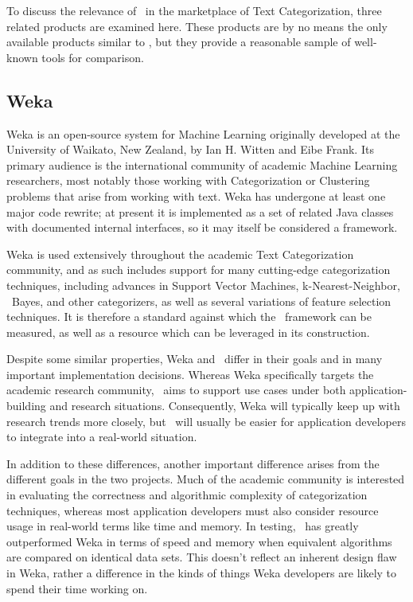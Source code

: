 To discuss the relevance of \aicat\ in the marketplace of Text
Categorization, three related products are examined here.  These
products are by no means the only available products similar to
\aicat, but they provide a reasonable sample of well-known tools for
comparison.

\subsection{Weka}

Weka is an open-source system for Machine Learning originally
developed at the University of Waikato, New Zealand, by Ian H. Witten
and Eibe Frank.\cite{weka} Its primary
audience is the international community of academic Machine Learning
researchers, most notably those working with Categorization or
Clustering problems that arise from working with text.  Weka has
undergone at least one major code rewrite; at present it is
implemented as a set of related Java classes with documented internal
interfaces, so it may itself be considered a framework.

Weka is used extensively throughout the academic Text Categorization
community, and as such includes support for many cutting-edge
categorization techniques, including advances in Support Vector
Machines, k-Nearest-Neighbor, \naive\ Bayes, and other categorizers, as
well as several variations of feature selection techniques.  It is
therefore a standard against which the \aicat\ framework can
be measured, as well as a resource which can be leveraged in its
construction.

Despite some similar properties, Weka and \aicat\ differ in
their goals and in many important implementation decisions.  Whereas
Weka specifically targets the academic research community,
\aicat\ aims to support use cases under both
application-building and research situations.
Consequently, Weka will typically keep up with research trends more
closely, but \aicat\ will usually be easier for application
developers to integrate into a real-world situation.

In addition to these differences, another important difference arises
from the different goals in the two projects.  Much of the academic
community is interested in evaluating the correctness and algorithmic
complexity of categorization techniques, whereas most application
developers must also consider resource usage in real-world terms like
time and memory.  In testing, \aicat\ has greatly outperformed
Weka in terms of speed and memory when equivalent algorithms are
compared on identical data sets.  This doesn't reflect an inherent
design flaw in Weka, rather a difference in the kinds of things Weka
developers are likely to spend their time working on.

